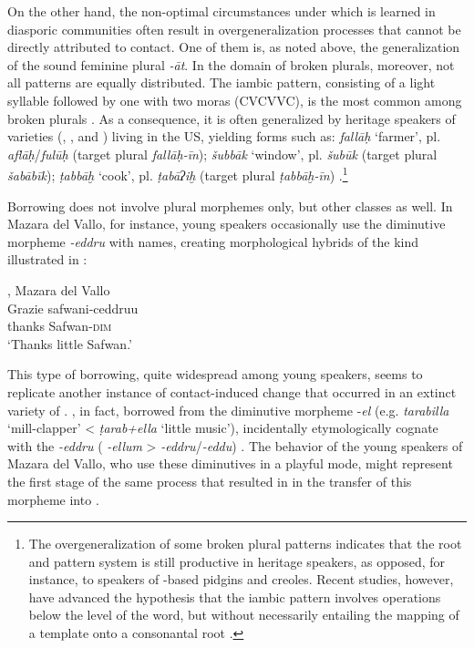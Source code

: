\documentclass[output=paper]{langsci/langscibook}
\begin{document}
On the other hand, the non-optimal circumstances under which  is learned in diasporic communities often result in overgeneralization processes that cannot be directly attributed to contact. One of them is, as noted above, the generalization of the sound feminine plural \textit{{}-āt}. In the domain of broken plurals, moreover, not all patterns are equally distributed. The iambic pattern, consisting of a light syllable followed by one with two moras (CVCVVC), is the most common among  broken plurals \citep[857]{AlbiriniBenmamoun2014}. As a consequence, it is often generalized by {heritage speakers} of  varieties (, ,  and ) living in the US, yielding forms such as: \textit{fallāḥ} ‘farmer’, pl. \textit{aflāḥ}\slash\textit{fulūḥ} (target plural \textit{fallāḥ-īn}); \textit{šubbāk} ‘window’, pl. \textit{šubūk} (target plural \textit{šabābīk}); \textit{ṭabbāḫ} ‘cook’, pl. \textit{ṭabāʔiḫ} (target plural \textit{ṭabbāḫ-īn}) \citep[865]{AlbiriniBenmamoun2014}.\footnote{The overgeneralization of some {broken plural} patterns indicates that the {root and pattern} system is still productive in {heritage speakers}, as opposed, for instance, to speakers of -based pidgins and creoles. Recent studies, however, have advanced the hypothesis that the iambic pattern involves operations below the level of the word, but without necessarily entailing the mapping of a template onto a consonantal {root} \citep[112]{AlbiriniSaadah2014}.} 

Borrowing does not involve plural morphemes only, but other classes as well. In {Mazara del Vallo}, for instance, young speakers occasionally use the  {diminutive} morpheme \textit{{}-eddru} with  names, creating morphological hybrids of the kind illustrated in  : 

\ea\label{maz1}
{ , {Mazara del Vallo} \citep[107]{Danna2017book}}\\
\gll Grazie safwani-ceddruu\footnotemark\\
     thanks Safwan-\textsc{dim}\\
\glt `Thanks little Safwan.'
\z

This type of borrowing, quite widespread among young speakers, seems to replicate another instance of contact-induced change that occurred in an extinct variety of .  , in fact, borrowed from  the {diminutive} morpheme -\textit{el} (e.g. \textit{tarabilla} ‘mill-clapper’ < \textit{ṭarab+ella} ‘little music’), incidentally etymologically {cognate} with the  \textit{{}-eddru} ( \textit{-ellum} >  \textit{-eddru}\slash\textit{-eddu}) \citep[60]{Andalusi2013}. The behavior of the young  speakers of {Mazara del Vallo}, who use these  diminutives in a playful mode, might represent the first stage of the same process that resulted in in the {transfer} of this morpheme into   \citep[108]{Danna2017book}.
\end{document}

